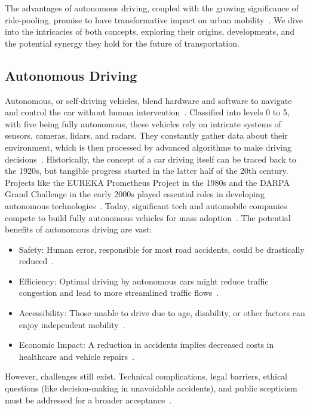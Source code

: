  The advantages of autonomous driving, coupled with the growing significance of ride-pooling, promise to have transformative impact on urban mobility~\cite{Stamadianos.2023}. We dive into the intricacies of both concepts, exploring their origins, developments, and the potential synergy they hold for the future of transportation.

\subsection{Autonomous Driving}
Autonomous, or self-driving vehicles, blend hardware and software to navigate and control the car without human intervention~\cite{Stamadianos.2023}. Classified into levels 0 to 5, with five being fully autonomous, these vehicles rely on intricate systems of sensors, cameras, lidars, and radars. They constantly gather data about their environment, which is then processed by advanced algorithms to make driving decisions~\cite{Hacohen.2022}.
Historically, the concept of a car driving itself can be traced back to the 1920s, but tangible progress started in the latter half of the 20th century. Projects like the EUREKA Prometheus Project in the 1980s and the DARPA Grand Challenge in the early 2000s played essential roles in developing autonomous technologies~\cite{Hacohen.2022}. Today, significant tech and automobile companies compete to build fully autonomous vehicles for mass adoption~\cite{Stamadianos.2023}.
The potential benefits of autonomous driving are vast:
\begin{itemize}
    \item Safety: Human error, responsible for most road accidents, could be drastically reduced~\cite{Hacohen.2022}.
    \item Efficiency: Optimal driving by autonomous cars might reduce traffic congestion and lead to more streamlined traffic flows~\cite{Stamadianos.2023}.
    \item Accessibility: Those unable to drive due to age, disability, or other factors can enjoy independent mobility~\cite{Hacohen.2022}.
    \item Economic Impact: A reduction in accidents implies decreased costs in healthcare and vehicle repairs~\cite{Stamadianos.2023}.
\end{itemize}

However, challenges still exist. Technical complications, legal barriers, ethical questions (like decision-making in unavoidable accidents), and public scepticism must be addressed for a broader acceptance~\cite{Hacohen.2022}.

